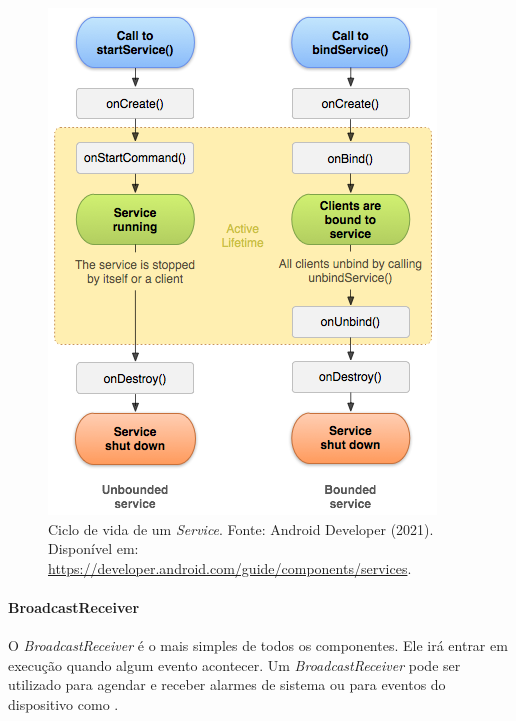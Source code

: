 \documentclass[12pt, a4paper]{article}
\newcommand{\tit}[1]{\textit{#1}}
\begin{document}
       
   \begin{figure}[!ht]
        \centering
        \includegraphics[width=\textwidth,height=0.4\textheight,keepaspectratio]{service_lifecycle.png}
        \caption{Ciclo de vida de um \tit{Service}. Fonte: Android Developer (2021). Disponível em: \url{https://developer.android.com/guide/components/services}.}
        \label{fig:service_lifecycle}
    \end{figure}
    
    \paragraph{BroadcastReceiver}
    O \tit{BroadcastReceiver} é o mais simples de todos os componentes. Ele irá entrar em execução quando algum evento acontecer. Um \tit{BroadcastReceiver} pode ser utilizado para agendar e receber alarmes de sistema ou para eventos do dispositivo como .\cite{android:broadcasts-overview}
   
\end{document}
